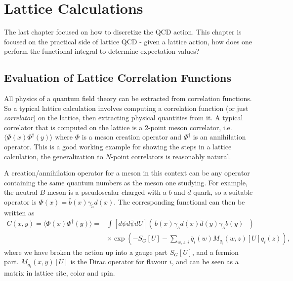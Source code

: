 ﻿\chapter{Lattice Calculations}
\label{chap:latticecalculations}

The last chapter focused on how to discretize the QCD action. This chapter is focused on the practical side of lattice QCD - given a lattice action, how does one perform the functional integral to determine expectation values?

\section{Evaluation of Lattice Correlation Functions}

All physics of a quantum field theory can be extracted from correlation functions. So a typical lattice calculation involves computing a correlation function (or just {\it{correlator}}) on the lattice, then extracting physical quantities from it. A typical correlator that is computed on the lattice is a 2-point meson correlator, i.e. $\langle\Phi(x)\Phi^{\dagger}(y)\rangle$ where $\Phi$ is a meson creation operator and $\Phi^{\dagger}$ is an annihilation operator. This is a good working example for showing the steps in a lattice calculation, the generalization to $N$-point correlators is reasonably natural.

A creation/annihilation operator for a meson in this context can be any operator containing the same quantum numbers as the meson one studying. For example, the neutral $B$ meson is a pseudoscalar charged with a $b$ and $\bar{d}$ quark, so a suitable operator is $\Phi(x) = \bar{b}(x)\gamma_5 d(x)$. The corresponding functional can then be written as
\begin{align}
  \nonumber
  C(x,y) = \langle \Phi(x)\Phi^{\dagger}(y)\rangle =& \int [d\psi d\bar{\psi} dU] \left(\, \bar{b}(x)\gamma_5 d(x) \bar{d}(y)\gamma_5 b(y) \text{ }\right) \\&\times \exp\left(-S_G[U]-\sum_{w,z,i} \bar{q}_i(w)M_{q_i}(w,z)[U]q_i(z)\right),
\end{align}
where we have broken the action up into a gauge part $S_G[U]$, and a fermion part. $M_{q_i}(x,y)[U]$ is the Dirac operator for flavour $i$, and can be seen as a matrix in lattice site, color and spin.


